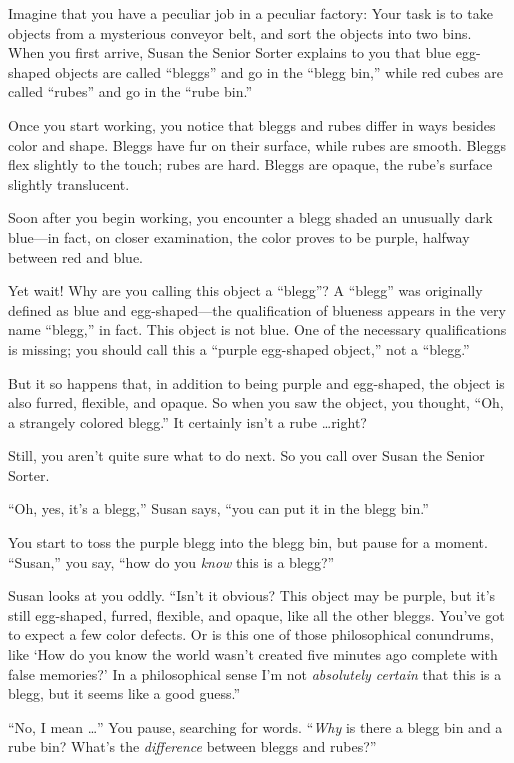 {
 Imagine that you have a peculiar job in a peculiar factory: Your
task is to take objects from a mysterious conveyor belt, and sort the
objects into two bins. When you first arrive, Susan the Senior Sorter
explains to you that blue egg-shaped objects are called
``bleggs'' and go in the
``blegg bin,'' while red cubes are
called ``rubes'' and go in the
``rube bin.'' }

{
 Once you start working, you notice that bleggs and rubes differ in
ways besides color and shape. Bleggs have fur on their surface, while
rubes are smooth. Bleggs flex slightly to the touch; rubes are hard.
Bleggs are opaque, the rube's surface slightly
translucent.}

{
 Soon after you begin working, you encounter a blegg shaded an
unusually dark blue---in fact, on closer examination, the color proves
to be purple, halfway between red and blue.}

{
 Yet wait! Why are you calling this object a
``blegg''? A
``blegg'' was originally defined as
blue and egg-shaped---the qualification of blueness appears in the very
name ``blegg,'' in fact. This object
is not blue. One of the necessary qualifications is missing; you should
call this a ``purple egg-shaped
object,'' not a
``blegg.''}

{
 But it so happens that, in addition to being purple and
egg-shaped, the object is also furred, flexible, and opaque. So when
you saw the object, you thought, ``Oh, a strangely
colored blegg.'' It certainly isn't a
rube \ldots right?}

{
 Still, you aren't quite sure what to do next. So
you call over Susan the Senior Sorter.}

{
 ``Oh, yes, it's a
blegg,'' Susan says, ``you can put
it in the blegg bin.''}

{
 You start to toss the purple blegg into the blegg bin, but pause
for a moment. ``Susan,'' you say,
``how do you \textit{know} this is a
blegg?''}

{
 Susan looks at you oddly. ``Isn't
it obvious? This object may be purple, but it's still
egg-shaped, furred, flexible, and opaque, like all the other bleggs.
You've got to expect a few color defects. Or is this
one of those philosophical conundrums, like `How do you
know the world wasn't created five minutes ago complete
with false memories?' In a philosophical sense
I'm not \textit{absolutely certain} that this is a
blegg, but it seems like a good guess.''}

{
 ``No, I mean \ldots'' You pause,
searching for words. ``\textit{Why} is there a blegg
bin and a rube bin? What's the \textit{difference}
between bleggs and rubes?''}

